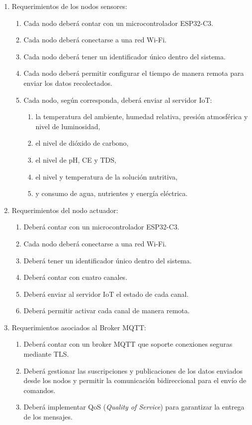 \begin{enumerate}
	\item Requerimientos de los nodos sensores:
	      \begin{enumerate}
		      \item Cada nodo deberá contar con un microcontrolador ESP32-C3.
		      \item Cada nodo deberá conectarse a una red Wi-Fi.
		      \item Cada nodo deberá tener un identificador único dentro del sistema.
		      \item Cada nodo deberá permitir configurar el tiempo de manera remota para enviar los datos recolectados.
		      \item Cada nodo, según corresponda, deberá enviar al servidor IoT:
		            \begin{enumerate}
			            \item la temperatura del ambiente, humedad relativa, presión atmosférica y nivel de luminosidad,
			            \item el nivel de dióxido de carbono,
			            \item el nivel de pH, CE y TDS,
			            \item el nivel y temperatura de la solución nutritiva,
			            \item y consumo de agua, nutrientes y energía eléctrica.
		            \end{enumerate}
	      \end{enumerate}

	\item Requerimientos del nodo actuador:
	      \begin{enumerate}
		      \item Deberá contar con un microcontrolador ESP32-C3.
		      \item Cada nodo deberá conectarse a una red Wi-Fi.
		      \item Deberá tener un identificador único dentro del sistema.
		      \item Deberá contar con cuatro canales.
		      \item Deberá enviar al servidor IoT el estado de cada canal.
		      \item Deberá permitir activar cada canal de manera remota.
	      \end{enumerate}

	\item Requerimientos asociados al Broker MQTT:
	      \begin{enumerate}
		      \item Deberá contar con un broker MQTT que soporte conexiones seguras mediante TLS.
		      \item Deberá gestionar las suscripciones y publicaciones de los datos enviados desde
		            los nodos y permitir la comunicación bidireccional para el envío de comandos.
		      \item Deberá implementar QoS (\textit{Quality of Service}) para garantizar la entrega de los mensajes.
	      \end{enumerate}


\end{enumerate}
